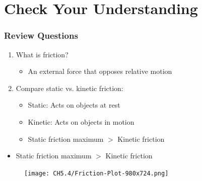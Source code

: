 \documentclass{beamer}
\begin{document}
\section{Check Your Understanding}

\begin{frame}
\frametitle{Review Questions}
\begin{enumerate}
    \item What is friction?
    \begin{itemize}
        \item An external force that opposes relative motion
    \end{itemize}
    
    \item Compare static vs. kinetic friction:
    \begin{itemize}
        \item Static: Acts on objects at rest
        \item Kinetic: Acts on objects in motion
        \item Static friction maximum $>$ Kinetic friction
    \end{itemize}
\end{enumerate}
\end{frame}


\begin{frame}

\end{frame}


\begin{frame}
    \begin{itemize}
        \item Static friction maximum $>$ Kinetic friction
    \end{itemize}
\begin{figure}[H]
    \centering
    \texttt{[image: CH5.4/Friction-Plot-980x724.png]}
\end{figure}
\end{frame}
\end{document}
